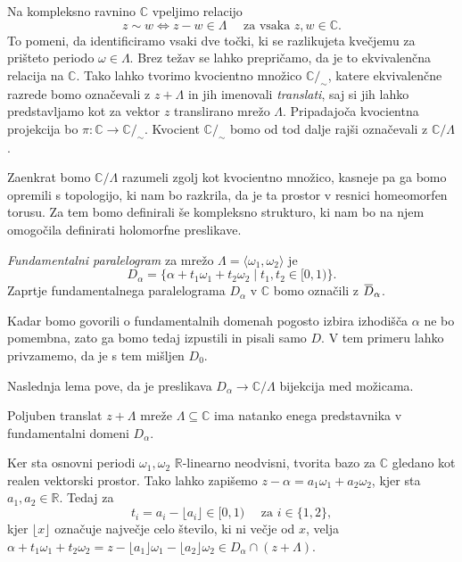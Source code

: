 \documentclass[mat1]{fmfdelo}
\numberwithin{equation}{section}
\newcommand{\R}{\mathbb R}
\newcommand{\C}{\mathbb C}
\newcommand{\om}{\omega}
\newcommand{\ols}[1]{\mskip.5\thinmuskip\overline{\mskip-.5\thinmuskip {#1} \mskip-.5\thinmuskip}\mskip.5\thinmuskip} %
\theoremstyle{definition}
\begin{document}
Na kompleksno ravnino $\C$ vpeljimo relacijo 
\[
    z \sim w \iff z - w \in \Lambda \quad \text{ za vsaka $z,w \in \C$.}
\]
To pomeni, da identificiramo vsaki dve točki, ki se razlikujeta kvečjemu za prišteto periodo $\omega \in \Lambda$. 
Brez težav se lahko prepričamo, da je to ekvivalenčna relacija na $\C$. Tako lahko tvorimo kvocientno množico $\C/_{\sim}$, katere ekvivalenčne razrede bomo označevali z $z + \Lambda$ in jih imenovali \emph{translati}, saj si jih lahko predstavljamo kot za vektor $z$ translirano mrežo $\Lambda$. Pripadajoča kvocientna projekcija bo $\pi : \C \to \C/_{\sim}$. Kvocient $\C/_{\sim}$ bomo od tod dalje rajši označevali z $\C/\Lambda$. 

Zaenkrat bomo $\C/\Lambda$ razumeli zgolj kot kvocientno množico, kasneje pa ga bomo opremili s topologijo, ki nam bo razkrila, da je ta prostor v resnici homeomorfen torusu. Za tem bomo definirali še kompleksno strukturo, ki nam bo na njem omogočila definirati holomorfne preslikave.


\begin{definicija}
    \emph{Fundamentalni paralelogram} za mrežo $\Lambda = \langle \om_1, \om_2 \rangle$ je
    \[
        D_{\alpha} = \{\alpha + t_1 \om_1 + t_2 \om_2 \mid t_1, t_2 \in [0,1)\}.
    \]
    Zaprtje fundamentalnega paralelograma $D_\alpha$ v $\C$ bomo označili z $\ols{D}_\alpha$. 
\end{definicija}

\begin{opomba}
    Kadar bomo govorili o fundamentalnih domenah pogosto izbira izhodišča $\alpha$ ne bo pomembna, zato ga bomo tedaj izpustili in pisali samo $D$. V tem primeru lahko privzamemo, da je s tem mišljen $D_0$. 
\end{opomba}

Naslednja lema pove, da je preslikava $D_\alpha \to \C/\Lambda$ bijekcija med možicama. 

\begin{lema}
    \label{enolicni predstavnik}
    Poljuben translat $z + \Lambda$ mreže $\Lambda \subseteq \C$ ima natanko enega predstavnika v fundamentalni domeni $D_\alpha$. 
\end{lema}

\begin{dokaz}
    Ker sta osnovni periodi $\omega_1, \omega_2$ $\R$-linearno neodvisni, tvorita bazo za $\C$ gledano kot realen vektorski prostor. Tako lahko zapišemo $z - \alpha = a_1 \om_1 + a_2 \om_2$, kjer sta $a_1, a_2 \in \R$. Tedaj za 
    \[
        t_i = a_i - \lfloor a_i \rfloor \in [0,1) \quad \text{ za $i \in \{1,2\}$},
    \] 
    kjer $\lfloor x \rfloor$ označuje največje celo število, ki ni večje od $x$, velja $\alpha + t_1\om_1 + t_2 \om_2 = z - \lfloor a_1 \rfloor \om_1 - \lfloor a_2 \rfloor \om_2 \in D_\alpha \cap (z + \Lambda)$.
\end{dokaz}
\end{document}
